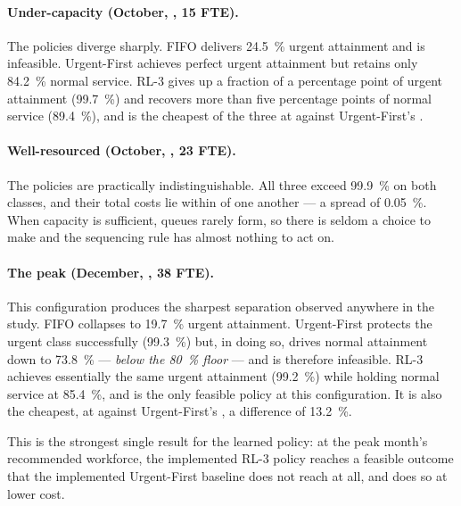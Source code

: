 \paragraph{Under-capacity (October, , 15 FTE).} The policies diverge sharply. FIFO
delivers \SI{24.5}{\percent} urgent attainment and is infeasible. Urgent-First achieves perfect
urgent attainment but retains only \SI{84.2}{\percent} normal service. RL-3 gives up a fraction
of a percentage point of urgent attainment (\SI{99.7}{\percent}) and recovers more than five
percentage points of normal service (\SI{89.4}{\percent}), and is the cheapest of the three at
 against Urgent-First's .

\paragraph{Well-resourced (October, , 23 FTE).} The policies are practically
indistinguishable. All three exceed \SI{99.9}{\percent} on both classes, and their total costs
lie within  of one another --- a spread of \SI{0.05}{\percent}. When capacity is
sufficient, queues rarely form, so there is seldom a choice to make and the sequencing rule has
almost nothing to act on.

\paragraph{The peak (December, , 38 FTE).} This configuration produces the
sharpest separation observed anywhere in the study. FIFO collapses to \SI{19.7}{\percent}
urgent attainment. Urgent-First protects the urgent class successfully
(\SI{99.3}{\percent}) but, in doing so, drives normal attainment down to
\SI{73.8}{\percent} --- \emph{below the \SI{80}{\percent} floor} --- and is therefore
infeasible. RL-3 achieves essentially the same urgent attainment (\SI{99.2}{\percent}) while
holding normal service at \SI{85.4}{\percent}, and is the only feasible policy at this
configuration. It is also the cheapest, at  against Urgent-First's , a
difference of \SI{13.2}{\percent}.

This is the strongest single result for the learned policy: at the peak month's recommended
workforce, the implemented RL-3 policy reaches a feasible outcome that the implemented
Urgent-First baseline does not reach at all, and does so at lower cost.

